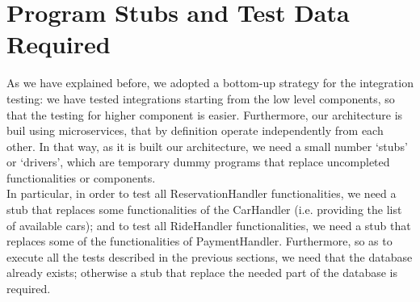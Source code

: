 \section{Program Stubs and Test Data Required}


As we have explained before, we adopted a bottom-up strategy for the integration testing: we have tested integrations starting from the low level components, so that the testing for higher component is easier. Furthermore, our architecture is buil using microservices, that by definition operate independently from each other. In that way, as it is built our architecture, we need a small number `stubs' or `drivers', which are temporary dummy programs that replace uncompleted functionalities or components. \\

In particular, in order to test all ReservationHandler functionalities, we need a stub that replaces some functionalities of the CarHandler (i.e. providing the list of available cars); and to test all RideHandler functionalities, we need a stub that replaces some of the functionalities of PaymentHandler.
Furthermore, so as to execute all the tests described in the previous sections, we need that the database already exists; otherwise a stub that replace the needed part of the database is required.


